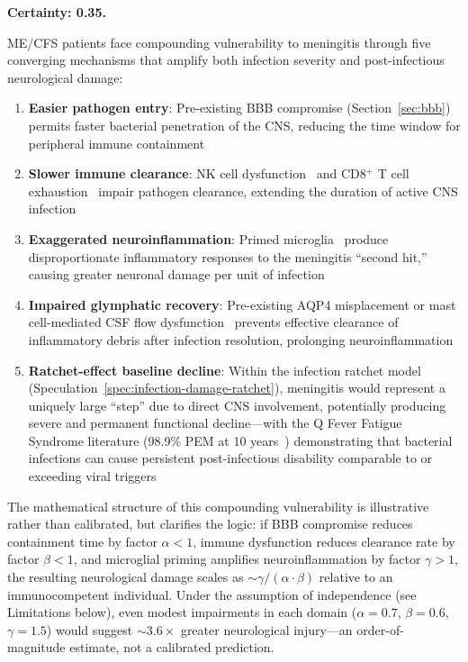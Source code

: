\begin{speculation}
\label{spec:meningitis-double-vulnerability}
\textbf{Certainty: 0.35.}

ME/CFS patients face compounding vulnerability to meningitis through five converging mechanisms that amplify both infection severity and post-infectious neurological damage:

\begin{enumerate}
    \item \textbf{Easier pathogen entry}: Pre-existing BBB compromise (Section~\ref{sec:bbb}) permits faster bacterial penetration of the CNS, reducing the time window for peripheral immune containment
    \item \textbf{Slower immune clearance}: NK cell dysfunction~\cite{Caligiuri1987nk,EatonFitch2019} and CD8$^+$ T cell exhaustion~\cite{iu2024tcell_exhaustion} impair pathogen clearance, extending the duration of active CNS infection
    \item \textbf{Exaggerated neuroinflammation}: Primed microglia~\cite{Gottschalk2022ATG13} produce disproportionate inflammatory responses to the meningitis ``second hit,'' causing greater neuronal damage per unit of infection
    \item \textbf{Impaired glymphatic recovery}: Pre-existing AQP4 misplacement or mast cell-mediated CSF flow dysfunction~\cite{Christodoulides2024meningitis,Pinas2022glymphatic} prevents effective clearance of inflammatory debris after infection resolution, prolonging neuroinflammation
    \item \textbf{Ratchet-effect baseline decline}: Within the infection ratchet model (Speculation~\ref{spec:infection-damage-ratchet}), meningitis would represent a uniquely large ``step'' due to direct CNS involvement, potentially producing severe and permanent functional decline---with the Q Fever Fatigue Syndrome literature (98.9\% PEM at 10 years~\cite{Spronk2023qfever}) demonstrating that bacterial infections can cause persistent post-infectious disability comparable to or exceeding viral triggers
\end{enumerate}

The mathematical structure of this compounding vulnerability is illustrative rather than calibrated, but clarifies the logic: if BBB compromise reduces containment time by factor $\alpha < 1$, immune dysfunction reduces clearance rate by factor $\beta < 1$, and microglial priming amplifies neuroinflammation by factor $\gamma > 1$, the resulting neurological damage scales as $\sim \gamma / (\alpha \cdot \beta)$ relative to an immunocompetent individual. Under the assumption of independence (see Limitations below), even modest impairments in each domain ($\alpha = 0.7$, $\beta = 0.6$, $\gamma = 1.5$) would suggest $\sim 3.6\times$ greater neurological injury---an order-of-magnitude estimate, not a calibrated prediction.


\end{speculation}
